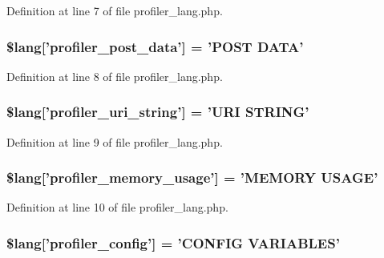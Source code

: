 Definition at line 7 of file profiler\-\_\-lang.\-php.

\hypertarget{profiler__lang_8php_a6b2928f829db3649049332dc4468018d}{
\subsubsection[{\$lang}]{\setlength{\rightskip}{0pt plus 5cm}\$lang\mbox{[}'profiler\-\_\-post\-\_\-data'\mbox{]} = 'P\-O\-S\-T D\-A\-T\-A'}}\label{profiler__lang_8php_a6b2928f829db3649049332dc4468018d}


Definition at line 8 of file profiler\-\_\-lang.\-php.

\hypertarget{profiler__lang_8php_a1f1644f4e586555cb83f718552502136}{
\subsubsection[{\$lang}]{\setlength{\rightskip}{0pt plus 5cm}\$lang\mbox{[}'profiler\-\_\-uri\-\_\-string'\mbox{]} = 'U\-R\-I S\-T\-R\-I\-N\-G'}}\label{profiler__lang_8php_a1f1644f4e586555cb83f718552502136}


Definition at line 9 of file profiler\-\_\-lang.\-php.

\hypertarget{profiler__lang_8php_aaffc8cc3dd25f21388a6edb5fbfc8859}{
\subsubsection[{\$lang}]{\setlength{\rightskip}{0pt plus 5cm}\$lang\mbox{[}'profiler\-\_\-memory\-\_\-usage'\mbox{]} = 'M\-E\-M\-O\-R\-Y U\-S\-A\-G\-E'}}\label{profiler__lang_8php_aaffc8cc3dd25f21388a6edb5fbfc8859}


Definition at line 10 of file profiler\-\_\-lang.\-php.

\hypertarget{profiler__lang_8php_a68a43f2ac48abfc21cd12ee19e75e421}{
\subsubsection[{\$lang}]{\setlength{\rightskip}{0pt plus 5cm}\$lang\mbox{[}'profiler\-\_\-config'\mbox{]} = 'C\-O\-N\-F\-I\-G V\-A\-R\-I\-A\-B\-L\-E\-S'}}\label{profiler__lang_8php_a68a43f2ac48abfc21cd12ee19e75e421}


